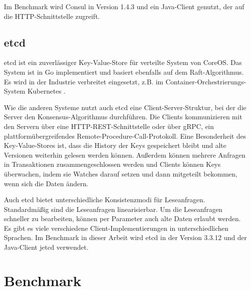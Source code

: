 Im Benchmark wird Consul in Version 1.4.3 und ein Java-Client \cite{consul-client} genutzt, der auf die HTTP-Schnittstelle zugreift.

\subsection{etcd}

etcd \cite{etcd} ist ein zuverlässiger Key-Value-Store für verteilte System von CoreOS. Das System ist in Go implementiert und basiert ebenfalls auf dem Raft-Algorithmus. Es wird in der Industrie verbreitet eingesetzt, z.B. im Container-Orchestrierungs-System Kubernetes \cite{kubernetes}.

Wie die anderen Systeme nutzt auch etcd eine Client-Server-Struktur, bei der die Server den Konsensus-Algorithmus durchführen. Die Clients kommunizieren mit den Servern über eine HTTP-REST-Schnittstelle oder über gRPC, ein plattformübergreifendes Remote-Procedure-Call-Protokoll. Eine Besonderheit des Key-Value-Stores ist, dass die History der Keys gespeichert bleibt und alte Versionen weiterhin gelesen werden können. Außerdem können mehrere Anfragen in Transaktionen zusammengeschlossen werden und Clients können Keys überwachen, indem sie Watches darauf setzen und dann mitgeteilt bekommen, wenn sich die Daten ändern.

Auch etcd bietet unterschiedliche Konsistenzmodi für Leseanfragen. Standardmäßig sind die Leseanfragen linearisierbar. Um die Leseanfragen schneller zu bearbeiten, können per Parameter auch alte Daten erlaubt werden. Es gibt es viele verschiedene Client\hyp{}Implementierungen in unterschiedlichen Sprachen. Im Benchmark in dieser Arbeit wird etcd in der Version 3.3.12 und der Java-Client jetcd \cite{jetcd} verwendet.

\section{Benchmark}
\label{benchmark}

